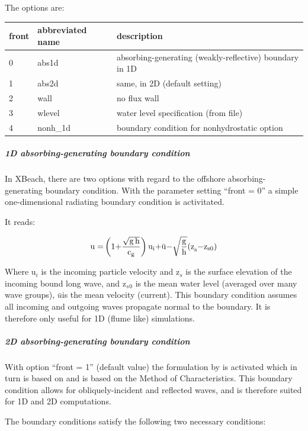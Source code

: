 The options are:

\begin{tabular}{|p{0.5in}|p{0.8in}|p{2.6in}|} \hline 
front & abbreviated name & description \\ \hline 
0 & abs1d & absorbing-generating (weakly-reflective) boundary in 1D \\ \hline 
1 & abs2d & same, in 2D (default setting) \\ \hline 
2 & wall & no flux wall \\ \hline 
3 & wlevel & water level specification (from file) \\ \hline 
4 & nonh\_1d & boundary condition for nonhydrostatic option \\ \hline 
\end{tabular}

\subparagraph{1D absorbing-generating boundary condition}

In XBeach, there are two options with regard to the offshore absorbing-generating boundary condition. With the parameter setting ``front = 0'' a simple one-dimensional radiating boundary condition is activitated. 

It reads:

\begin{equation} \label{ZEqnNum247802} 
{\rm u=}\left({\rm 1+}\frac{\sqrt{{\rm g}\, {\rm h}} }{{\rm c}_{{\rm g}} } \right){\rm u}_{{\rm i}} {\rm +}\bar{{\rm u}}{\rm -}\sqrt{\frac{{\rm g}}{{\rm h}} } {\rm (z}_{{\rm s}} {\rm -z}_{{\rm s0}} {\rm )} 
\end{equation} 

Where u${}_{i}$ is the incoming particle velocity and z${}_{s}$ is the surface elevation of the incoming bound long wave, and z${}_{s}$${}_{0}$ is the mean water level (averaged over many wave groups), $\bar{u}$is the mean velocity (current). This boundary condition assumes all incoming and outgoing waves propagate normal to the boundary. It is therefore only useful for 1D (flume like) simulations.

\subparagraph{2D absorbing-generating boundary condition}

With option ``front = 1'' (default value) the formulation by \citet{VanDongeren1997} is activated which in turn is based on \citet{Verboom1981} and is based on the Method of Characteristics. This boundary condition allows for obliquely-incident and reflected waves, and is therefore suited for 1D and 2D computations. 

The boundary conditions satisfy the following two necessary conditions:  

